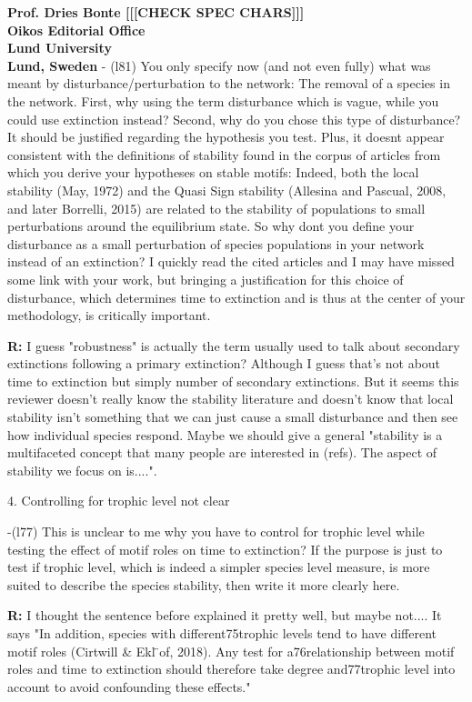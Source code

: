 \documentclass[12pt]{letter}
\begin{document}
\begin{letter}{\bf Prof. Dries Bonte [[[CHECK SPEC CHARS]]]\\
Oikos Editorial Office \\
Lund University \\
Lund, Sweden}
      - (l81) You only specify now (and not even fully) what was meant by disturbance/perturbation to the network: The removal of a species in the network. First, why using the term disturbance which is vague, while you could use extinction instead? Second, why do you chose this type of disturbance? It should be justified regarding the hypothesis you test. Plus, it doesnt appear consistent with the definitions of stability found in the corpus of articles from which you derive your hypotheses on stable motifs: Indeed, both the local stability (May, 1972) and the Quasi Sign stability (Allesina and Pascual, 2008, and later Borrelli, 2015) are related to the stability of populations to small perturbations around the equilibrium state. So why dont you define your disturbance as a small perturbation of species populations in your network instead of an extinction? I quickly read the cited articles and I may have missed some link with your work, but bringing a justification for this choice of disturbance, which determines time to extinction and is thus at the center of your methodology, is critically important.

      \textbf{R:}
      I guess "robustness" is actually the term usually used to talk about secondary extinctions following a primary extinction? Although I guess that's not about time to extinction but simply number of secondary extinctions. But it seems this reviewer doesn't really know the stability literature and doesn't know that local stability isn't something that we can just cause a small disturbance and then see how individual species respond. Maybe we should give a general "stability is a multifaceted concept that many people are interested in (refs). The aspect of stability we focus on is....".


    4. Controlling for trophic level not clear

      -(l77) This is unclear to me why you have to control for trophic level while testing the effect of motif roles on time to extinction? If the purpose is just to test if trophic level, which is indeed a simpler species level measure, is more suited to describe the species stability, then write it more clearly here.

      \textbf{R:}
      I thought the sentence before explained it pretty well, but maybe not.... It says "In addition, species with different75trophic levels tend to have different motif roles (Cirtwill & Ekl ̈of, 2018). Any test for a76relationship between motif roles and time to extinction should therefore take degree and77trophic level into account to avoid confounding these effects."



\end{letter}
\end{document}
